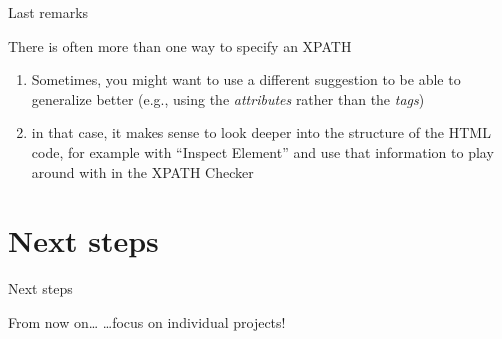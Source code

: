 \documentclass{beamer}
\begin{document}
\begin{frame}{Last remarks}
	\begin{block}{There is often more than one way to specify an XPATH}
		\begin{enumerate}
			\item Sometimes, you might want to use a different suggestion to be able to generalize better (e.g., using the \emph{attributes} rather than the \emph{tags})
			\item in that case, it makes sense to look deeper into the structure of the HTML code, for example with ``Inspect Element'' and use that information to play around with in the XPATH Checker
		\end{enumerate}
	\end{block}
\end{frame}


{
	\begin{frame}[plain]
	\end{frame}
}

\section{Next steps}
\begin{frame}
Next steps
\end{frame}




\begin{frame}{From now on\ldots}
\ldots focus on individual projects!
\end{frame}
\end{document}
